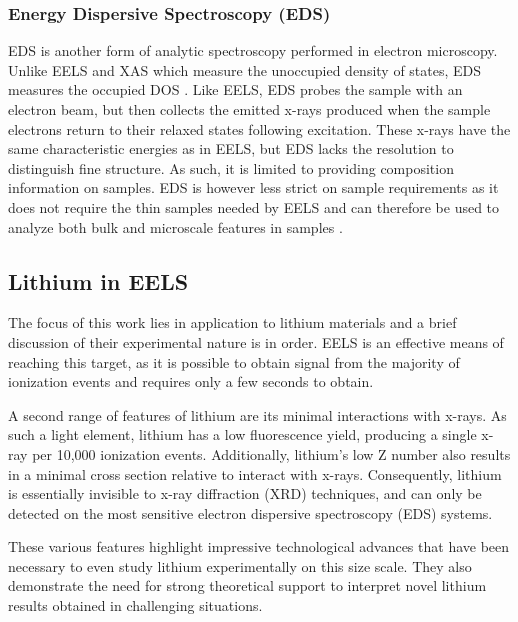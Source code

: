 \subsubsection{Energy Dispersive Spectroscopy (EDS)}
EDS is another form of analytic spectroscopy performed in electron microscopy.   Unlike EELS and XAS which measure the unoccupied density of states, EDS measures the occupied DOS \cite{goldstein_electron_2003}.  Like EELS, EDS probes the sample with an electron beam, but then collects the emitted x-rays produced when the sample electrons return to their relaxed states following excitation.  These x-rays have the same characteristic energies as in EELS, but EDS lacks the resolution to distinguish fine structure.  As such, it is limited to providing composition information on samples.  EDS is however less strict on sample requirements as it does not require the thin samples needed by EELS and can therefore be used to analyze both bulk and microscale features in samples \cite{goldstein_electron_2003}.

\subsection{Lithium in EELS}
The focus of this work lies in application to lithium materials and a brief discussion of their experimental nature is in order.  EELS is an effective means of reaching this target, as it is possible to obtain signal from the majority of ionization events and requires only a few seconds to obtain.  

A second range of features of lithium are its minimal interactions with x-rays.  As such a light element, lithium has a low fluorescence yield, producing a single x-ray per 10,000 ionization events.  Additionally, lithium's low Z number also results in a minimal cross section relative to interact with x-rays.  Consequently, lithium is essentially invisible to x-ray diffraction (XRD) techniques, and can only be detected on the most sensitive electron dispersive spectroscopy (EDS) systems.

These various features highlight impressive technological advances that have been necessary to even study lithium experimentally on this size scale.  They also demonstrate the need for strong theoretical support to interpret novel lithium results obtained in challenging situations.  




